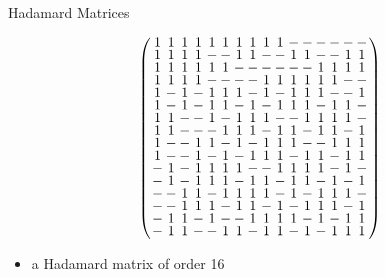 \documentclass{beamer}
\begin{document}
\begin{frame}{Hadamard Matrices}

  \[
    \arraycolsep=1.0pt\def\arraystretch{0.75}
    \left(\begin{array}{cccccccccccccccc}
            1&1&1&1&1&1&1&1&1&1&-&-&-&-&-&-\\
            1&1&1&1&-&-&1&1&-&-&1&1&-&-&1&1\\
            1&1&1&1&1&1&-&-&-&-&-&-&1&1&1&1\\
            1&1&1&1&-&-&-&-&1&1&1&1&1&1&-&-\\
            1&-&1&-&1&1&1&-&1&-&1&1&1&-&-&1\\
            1&-&1&-&1&1&-&1&-&1&1&1&-&1&1&-\\
            1&1&-&-&1&-&1&1&1&-&-&1&1&1&1&-\\
            1&1&-&-&-&1&1&1&-&1&1&-&1&1&-&1\\
            1&-&-&1&1&-&1&-&1&1&1&-&-&1&1&1\\
            1&-&-&1&-&1&-&1&1&1&-&1&1&-&1&1\\
            -&1&-&1&1&1&1&-&-&1&1&1&1&-&1&-\\
            -&1&-&1&1&1&-&1&1&-&1&1&-&1&-&1\\
            -&-&1&1&-&1&1&1&1&-&1&-&1&1&1&-\\
            -&-&1&1&1&-&1&1&-&1&-&1&1&1&-&1\\
            -&1&1&-&1&-&-&1&1&1&1&-&1&-&1&1\\
            -&1&1&-&-&1&1&-&1&1&-&1&-&1&1&1\\
    \end{array}\right)
  \]

  \begin{itemize}
    \item a Hadamard matrix of order 16
  \end{itemize}
  
\end{frame}
\end{document}
